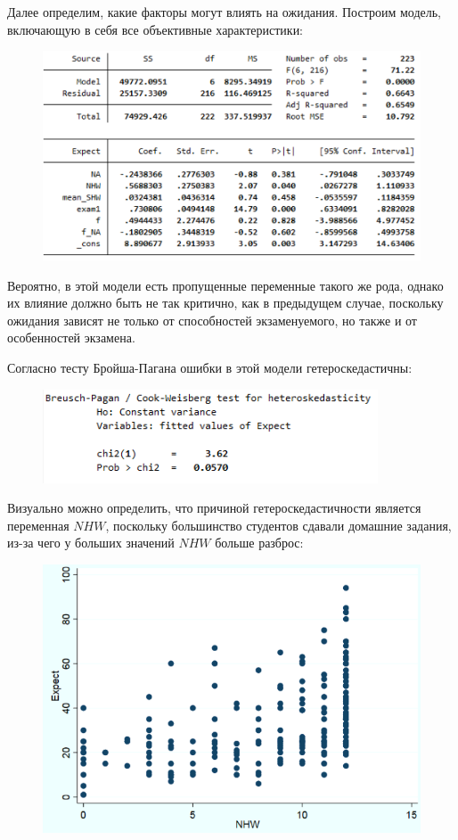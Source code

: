\documentclass[12pt,a4paper, oneside]{extreport}
\begin{document}
Далее определим, какие факторы могут влиять на ожидания. Построим модель, включающую в себя все объективные характеристики:

\begin{figure}[h!]
	\centering
	\includegraphics[width=0.7\linewidth]{screenshot007}
	\label{fig:screenshot007}
\end{figure}




Вероятно, в этой модели есть пропущенные переменные такого же рода, однако их влияние должно быть не так критично, как в предыдущем случае, поскольку  ожидания зависят не только от способностей экзаменуемого, но также и от  особенностей экзамена.


Согласно тесту Бройша-Пагана  ошибки в этой модели гетероскедастичны: 

\begin{figure}[h!]
	\centering
	\includegraphics{screenshot008}
	\label{fig:screenshot008}
\end{figure}

\newpage

Визуально можно определить, что причиной гетероскедастичности является переменная $NHW$, поскольку большинство студентов сдавали домашние задания, из-за чего у больших значений $NHW$ больше разброс:

\begin{figure}
	\centering
	\includegraphics[width=0.7\linewidth]{screenshot009}
	\label{fig:screenshot009}
\end{figure}
\end{document}
